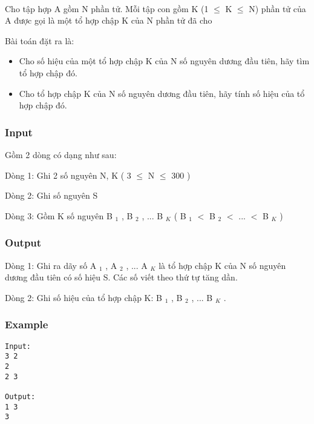 

 

Cho tập hợp A gồm N phần tử. Mỗi tập con gồm K (1  $\le$  K  $\le$  N) phần tử của A được gọi là một tổ hợp chập K của N phần tử đã cho

Bài toán đặt ra là:
\begin{itemize}
	\item Cho số hiệu của một tổ hợp chập K của N số nguyên dương đầu tiên, hãy tìm tổ hợp chập đó.
	\item Cho tổ hợp chập K của N số nguyên dương đầu tiên, hãy tính số hiệu của tổ hợp chập đó.
\end{itemize}

\subsubsection{Input}

Gồm 2 dòng có dạng như sau:

Dòng 1: Ghi 2 số nguyên N, K ( 3  $\le$  N  $\le$  300 )

Dòng 2: Ghi số nguyên S

Dòng 3: Gồm K số nguyên B $_ 1 $ , B $_ 2 $ , ... B $_ K $ ( B $_ 1 $ $<$ B $_ 2 $ $<$ ... $<$ B $_ K $ )

\subsubsection{Output}

Dòng 1: Ghi ra dãy số A $_ 1 $ , A $_ 2 $ , ... A $_ K $ là tổ hợp chập K của N số nguyên dương đầu tiên có số hiệu S. Các số viết theo thứ tự tăng dần.

Dòng 2: Ghi số hiệu của tổ hợp chập K: B $_ 1 $ , B $_ 2 $ , ... B $_ K $ .

\subsubsection{Example}
\begin{verbatim}
Input:
3 2 
2
2 3

Output:
1 3
3

\end{verbatim}
